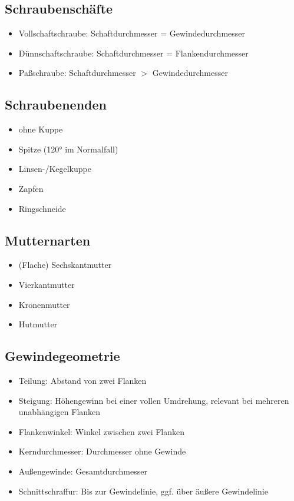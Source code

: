 \documentclass[a4paper,parskip=half*,DIV=7,fontsize=11pt]{scrartcl}
\begin{document}
\subsection{Schraubenschäfte}
\begin{itemize}
	\item Vollschaftschraube: Schaftdurchmesser =
	      Gewindedurchmesser 
	\item Dünnschaftschraube: Schaftdurchmesser =
	      Flankendurchmesser 
	\item Paßschraube: Schaftdurchmesser $>$ Gewindedurchmesser 
\end{itemize}
	
\subsection{Schraubenenden}
\begin{itemize}
	\item ohne Kuppe
	\item Spitze (120° im Normalfall)
	\item Linsen-/Kegelkuppe
	\item Zapfen
	\item Ringschneide
\end{itemize}
	
\subsection{Mutternarten}
\begin{itemize}
	\item (Flache) Sechskantmutter
	\item Vierkantmutter
	\item Kronenmutter
	\item Hutmutter
\end{itemize}
	
\subsection{Gewindegeometrie}
\begin{itemize}
	\item Teilung: Abstand von zwei Flanken
	\item Steigung: Höhengewinn bei einer vollen Umdrehung, relevant bei mehreren unabhängigen Flanken
	\item Flankenwinkel: Winkel zwischen zwei Flanken
	\item Kerndurchmesser: Durchmesser ohne Gewinde
	\item Außengewinde: Gesamtdurchmesser
	\item Schnittschraffur: Bis zur Gewindelinie, ggf. über äußere Gewindelinie
\end{itemize}
	
\end{document}
